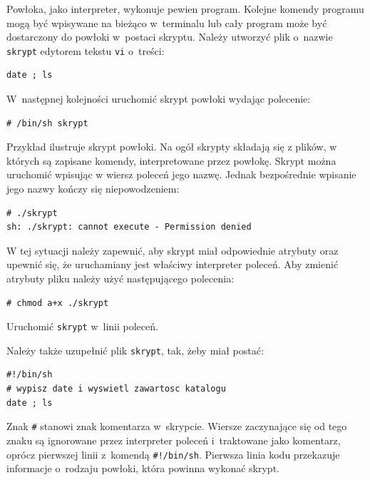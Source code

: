 \begin{example} \label{ex:prostakomenda7}


Powłoka, jako interpreter, wykonuje pewien program.  Kolejne komendy programu mogą być wpisywane na bieżąco w~terminalu lub cały program może być dostarczony do powłoki w~postaci skryptu. Należy utworzyć plik o~nazwie \lstinline[style=MyBashStyle]{skrypt} edytorem tekstu \lstinline[style=MyBashStyle]{vi} o~treści:

\begin{lstlisting}[style=MyBashStyle]
date ; ls
\end{lstlisting}

W~następnej kolejności uruchomić skrypt powłoki wydając polecenie:

\begin{lstlisting}[style=MyBashStyle]
# /bin/sh skrypt
\end{lstlisting}

Przykład ilustruje skrypt powłoki. Na ogół skrypty składają się z plików, w których są zapisane komendy, interpretowane przez powłokę. Skrypt można uruchomić wpisując w wiersz poleceń jego nazwę. Jednak bezpośrednie wpisanie jego nazwy kończy się niepowodzeniem:

\begin{lstlisting}[style=MyBashStyle]
# ./skrypt
sh: ./skrypt: cannot execute - Permission denied
\end{lstlisting}

W tej sytuacji należy zapewnić, aby skrypt miał odpowiednie atrybuty oraz upewnić się, że uruchamiany jest właściwy interpreter poleceń. Aby zmienić atrybuty pliku należy użyć następującego polecenia:

\begin{lstlisting}[style=MyBashStyle]
# chmod a+x ./skrypt
\end{lstlisting}

Uruchomić \lstinline[style=MyBashStyle]{skrypt} w~linii poleceń.
\end{example}


\begin{example}\label{ex:prostakomenda8}


Należy także uzupełnić plik \lstinline[style=MyBashStyle]{skrypt}, tak, żeby miał postać:

\begin{lstlisting}[style=MyBashStyle]
#!/bin/sh
# wypisz date i wyswietl zawartosc katalogu
date ; ls
\end{lstlisting}

Znak \lstinline[style=MyBashStyle]{#} stanowi znak komentarza w~skrypcie. Wiersze zaczynające się od tego znaku są ignorowane przez interpreter poleceń i~traktowane jako komentarz, oprócz pierwszej linii z~komendą \lstinline[style=MyBashStyle]{#!/bin/sh}. Pierwsza linia kodu przekazuje informacje o~rodzaju powłoki, która powinna wykonać skrypt.
\end{example}


